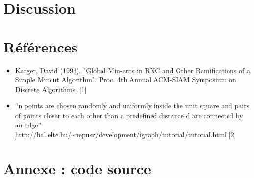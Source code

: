 \documentclass[a4paper,10pt]{article}
\begin{document}
\section {Discussion}

\section{Références}

\begin{itemize}
  \item Karger, David (1993). "Global Min-cuts in RNC and Other Ramifications of a Simple Mincut Algorithm". Proc. 4th Annual ACM-SIAM Symposium on Discrete Algorithms. [1]
  \item ``n points are chosen randomly and uniformly inside the unit square and pairs of points closer to each other than a predefined distance d are connected by an edge'' \url{http://hal.elte.hu/~nepusz/development/igraph/tutorial/tutorial.html} [2]
\end{itemize}


\section{Annexe : code source}

\end{document}
